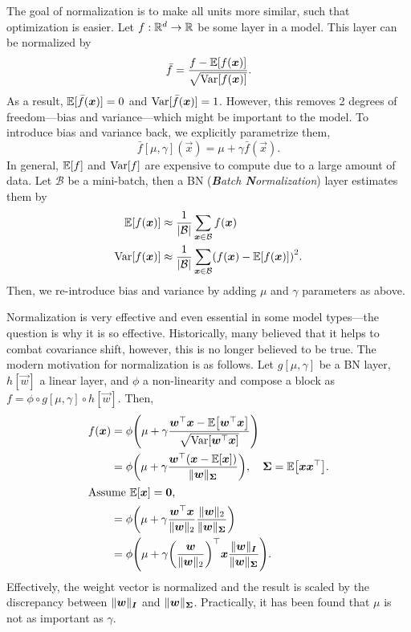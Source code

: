 The goal of normalization is to make all units more similar, such that optimization is easier. Let
$f: \mathbb{R}^d \to \mathbb{R}$ be some layer in a model. This layer can be normalized by \[
    \bar{f} = \frac{f - \mathbb{E}[f(\bm{x})]}{\sqrt{\mathrm{Var}[f(\bm{x})]}}.
\]
As a result, $\mathbb{E}[\bar{f}(\bm{x})] = 0$ and $\mathrm{Var}[\bar{f}(\bm{x})] = 1$. However, this removes 2
degrees of freedom---bias and variance---which might be important to the model. To introduce bias
and variance back, we explicitly parametrize them, \[
    \bar{f}[\mu, \gamma](\vec{x}) = \mu + \gamma \bar{f}(\vec{x}).
\]
In general, $\mathbb{E}[f]$ and $\mathrm{Var}[f]$ are expensive to compute due to a large amount of data. Let
$\mathcal{B}$ be a mini-batch, then a BN (\textit{\textbf{B}atch \textbf{N}ormalization}) layer
estimates them by
\begin{align*}
    \E[f(\vec{x})]   & \approx \frac{1}{|\mathcal{B}|} \sum_{\vec{x} \in \mathcal{B}} f(\vec{x})                                 \\
    \Var[f(\vec{x})] & \approx \frac{1}{|\mathcal{B}|} \sum_{\vec{x} \in \mathcal{B}} \lft( f(\vec{x}) - \E[f(\vec{x})] \rgt)^2.
\end{align*}
Then, we re-introduce bias and variance by adding $\mu$ and $\gamma$ parameters as above.

Normalization is very effective and even essential in some model types---the question is why it is
so effective. Historically, many believed that it helps to combat covariance shift, however, this
is no longer believed to be true. The modern motivation for normalization is as follows. Let
$g[\mu, \gamma]$ be a BN layer, $h[\vec{w}]$ a linear layer, and $\phi$ a non-linearity and compose
a block as $f = \phi \circ g[\mu, \gamma] \circ h[\vec{w}]$. Then,
\begin{align*}
    f(\vec{x}) & = \phi \lft( \mu + \gamma \frac{\transpose{\vec{w}} \vec{x} - \E\lft[ \transpose{\vec{w}}\vec{x} \rgt]}{\sqrt{\Var\lft[ \transpose{\vec{w}}\vec{x} \rgt]}} \rgt)                   \\
               & = \phi \lft( \mu + \gamma \frac{\transpose{\vec{w}} (\vec{x} - \E[\vec{x}])}{\| \vec{w} \|_{\mat{\Sigma}}} \rgt), \quad \mat{\Sigma} = \E \lft[ \vec{x} \transpose{\vec{x}} \rgt]. \\
    \intertext{Assume $\E[\vec{x}] = \vec{0}$,}
               & = \phi \lft( \mu + \gamma \frac{\transpose{\vec{w}}\vec{x}}{\| \vec{w} \|_2} \frac{\| \vec{w} \|_2}{\| \vec{w} \|_{\mat{\Sigma}}} \rgt)                                            \\
               & = \phi \lft( \mu + \gamma \transpose{\lft( \frac{\vec{w}}{\| \vec{w} \|_2} \rgt)} \vec{x} \frac{\| \vec{w} \|_{\mat{I}}}{\| \vec{w} \|_{\mat{\Sigma}}} \rgt).
\end{align*}
Effectively, the weight vector is normalized and the result is scaled by the discrepancy between
$\| \bm{w} \|_{\bm{I}}$ and $\| \bm{w} \|_{\bm{\Sigma}}$. Practically, it has been found that $\mu$
is not as important as $\gamma$.

